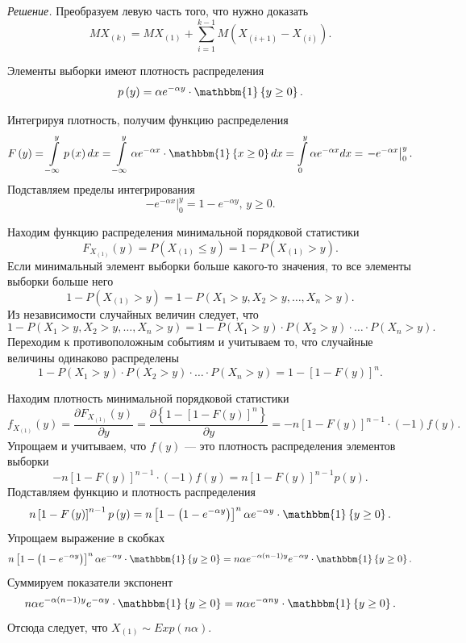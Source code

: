 \textit{Решение.} Преобразуем левую часть того, что нужно доказать
$$MX_{ \left( k \right) } =
  MX_{ \left( 1 \right) } +
  \sum \limits_{i = 1}^{k - 1}
    M \left( X_{ \left( i + 1 \right) } - X_{ \left(i \right) } \right).$$

Элементы выборки имеют плотность распределения
$$p \left( y \right) =
  \alpha e^{- \alpha y} \cdot \mathbbm{1} \left\{ y \geq 0 \right\}.$$

Интегрируя плотность, получим функцию распределения
$$F \left( y \right) =
  \int \limits_{- \infty }^y p \left( x \right) dx =
  \int \limits_{- \infty }^y \alpha e^{- \alpha x} \cdot \mathbbm{1} \left\{ x \geq 0 \right\} dx =
  \int \limits_0^y \alpha e^{- \alpha x} dx =
  \left. -e^{- \alpha x} \right|_0^y.$$
Подставляем пределы интегрирования
$$ \left. -e^{- \alpha x} \right|_0^y =
  1 - e^{- \alpha y}, \,
  y \geq 0.$$

Находим функцию распределения минимальной порядковой статистики
$$F_{X_{ \left( 1 \right) }} \left( y \right) =
  P \left( X_{ \left( 1 \right) } \leq y \right) =
  1 - P \left( X_{ \left( 1 \right) } > y \right).$$
Если минимальный элемент выборки больше какого-то значения, то все элементы выборки больше него
$$1 - P \left( X_{ \left( 1 \right) } > y \right) =
  1 - P \left( X_1 > y, X_2 > y, \dotsc, X_n > y \right).$$
Из независимости случайных величин следует, что
$$1 - P \left( X_1 > y, X_2 > y, \dotsc, X_n > y \right) =
  1 -
  P \left( X_1 > y \right) \cdot
  P \left( X_2 > y \right) \cdot
  \dotsc \cdot
  P \left( X_n > y \right).$$
Переходим к противоположным событиям и учитываем то, что случайные величины одинаково распределены
$$1 -
  P \left( X_1 > y \right) \cdot
  P \left( X_2 > y \right) \cdot
  \dotsc \cdot
  P \left( X_n > y \right) =
  1 - \left[ 1 - F \left( y \right) \right]^n.$$

Находим плотность минимальной порядковой статистики
$$f_{X_{ \left( 1 \right) }} \left( y \right) =
  \frac{ \partial F_{X_{ \left( 1 \right) }} \left( y \right) }{ \partial y} =
  \frac{ \partial \left\{ 1 - \left[ 1 - F \left( y \right) \right]^n \right\} }{ \partial y} =
  -n \left[ 1 - F \left( y \right) \right]^{n - 1} \cdot \left( -1 \right) f \left( y \right).$$
Упрощаем и учитываем, что $f \left( y \right) $ --- это плотность распределения элементов выборки
$$-n \left[ 1 - F \left( y \right) \right]^{n - 1} \cdot \left( -1 \right) f \left( y \right) =
  n \left[ 1 - F \left( y \right) \right]^{n - 1} p \left( y \right).$$
Подставляем функцию и плотность распределения
$$n \left[ 1 - F \left( y \right) \right]^{n - 1} p \left( y \right) =
  n \left[ 1 - \left( 1 - e^{- \alpha y} \right) \right]^n \alpha e^{- \alpha y} \cdot
  \mathbbm{1} \left\{ y \geq 0 \right\}.$$
Упрощаем выражение в скобках
$$n \left[ 1 - \left( 1 - e^{- \alpha y} \right) \right]^n \alpha e^{- \alpha y} \cdot
  \mathbbm{1} \left\{ y \geq 0 \right\} =
  n \alpha e^{- \alpha \left( n - 1 \right) y} e^{- \alpha y} \cdot
  \mathbbm{1} \left\{ y \geq 0 \right\}.$$
Суммируем показатели экспонент
$$n \alpha e^{- \alpha \left( n - 1 \right) y} e^{- \alpha y} \cdot
  \mathbbm{1} \left\{ y \geq 0 \right\} =
  n \alpha e^{- \alpha ny} \cdot \mathbbm{1} \left\{ y \geq 0 \right\}.$$
Отсюда следует, что $X_{ \left( 1 \right) } \sim Exp \left( n \alpha \right) $.

